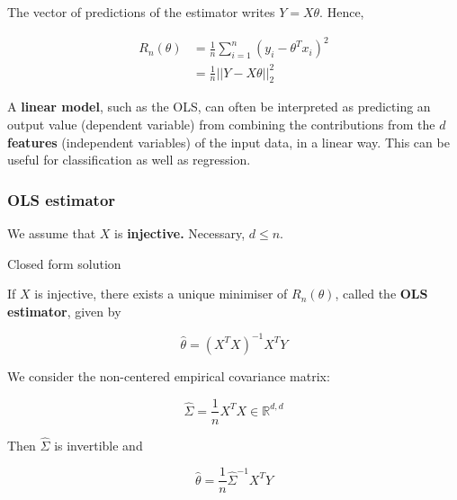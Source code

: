 \documentclass[
10pt, %
a4paper, %
oneside, %
headinclude,footinclude, %
BCOR5mm, %
]{scrartcl}
\begin{document}
The vector of predictions of the estimator writes $Y = X\theta$.  Hence,

\begin{equation*}
    \begin{aligned}
	R_n(\theta) &= \frac{1}{n} \sum^{n}_{i=1} (y_i-\theta^Tx_i)^2\\
	&= \frac{1}{n} ||Y-X\theta||_2^2
    \end{aligned}
\end{equation*}

\begin{remark}
    A \textbf{{linear model}}, such as the OLS, can often be interpreted as
    predicting an output value (dependent variable) from combining the contributions from the $d$
    \textbf{{features}} (independent variables) of the input data, in a linear
    way. This can be useful for classification as well as regression.
\end{remark}

\subsubsection{\large\color{Periwinkle}OLS estimator}

We assume that $X$ is \textbf{{injective.}}  Necessary, $d\leq n$.

\begin{proposition}{Closed form solution}
    
    If $X$ is injective, there exists a unique minimiser of $R_n(\theta)$, called the \textbf{{OLS estimator}}, given by

    \begin{equation}
	\label{def:ols}
	\hat{ \theta}= (X^TX)^{-1}X^TY
    \end{equation}
\end{proposition}

\begin{remark}

    We consider the non-centered empirical covariance matrix:

    \begin{equation}
	\label{eq:Sigma}
	\hat{\Sigma} = \frac{1}{n} X^TX\in \mathbb{R}^{d, d}
    \end{equation}

    Then $ \hat{\Sigma}$ is invertible and

    \begin{equation}
	\hat{\theta} = \frac{1}{n} \hat{\Sigma}^{-1} X^TY
    \end{equation}
    
\end{remark}
\end{document}
